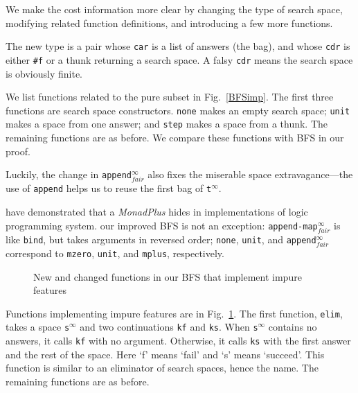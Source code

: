 \documentclass[format=acmlarge, review=true, authordraft=true]{acmart}
\newcommand{\BFSser}[0]{BFS}
\newcommand{\BFSimp}[0]{our improved BFS}
\begin{document}
We make the cost information more clear by changing the type of search space, 
modifying related function definitions, and introducing a few more functions.

The new type is a pair whose \texttt{car} is a list of answers (the bag), and 
whose \texttt{cdr} is either \texttt{\#{}f} or a thunk returning a search 
space. A falsy \texttt{cdr} means the search space is obviously finite. 

We list functions related to the pure subset in Fig.~\ref{BFSimp}. The first 
three functions are search space constructors. \texttt{none} makes an empty 
search space; \texttt{unit} makes a space from one answer; and \texttt{step} 
makes a space from a thunk. The remaining functions are as before. We compare 
these functions with \BFSser{} in our proof. 

Luckily, the change in \texttt{append$^\infty_{fair}$} also fixes the miserable 
space extravagance---the use of \texttt{append} helps us to reuse the first bag 
of \texttt{t$^\infty$}.

\citet{kiselyov2005backtracking} have demonstrated that a \emph{MonadPlus} 
hides in implementations of logic programming system. \BFSimp{} is not an 
exception: \texttt{append-map$^\infty_{fair}$} is like \texttt{bind}, but takes 
arguments in reversed order; \texttt{none}, \texttt{unit}, and 
\texttt{append$^\infty_{fair}$} correspond to \texttt{mzero}, \texttt{unit}, and 
\texttt{mplus}, respectively.


\begin{figure}
		
	\caption{New and changed functions in our BFS that implement impure 
		features}
	\label{BFSimp-cont}
\end{figure}


Functions implementing impure features are in Fig.~\ref{BFSimp-cont}. The 
first function, \texttt{elim}, takes a space \texttt{s$^\infty$} and two 
continuations \texttt{kf} and \texttt{ks}. When \texttt{s$^\infty$} contains 
no answers, it calls \texttt{kf} with no argument. Otherwise, it calls 
\texttt{ks} with the first answer and the rest of the space. Here  `f' means 
`fail' and `s' means `succeed'. This function is similar to an eliminator of 
search spaces, hence the name. The remaining functions are as before.
\end{document}
